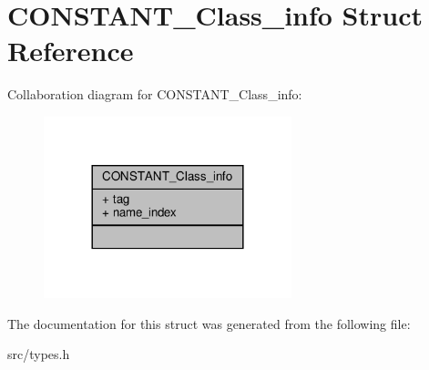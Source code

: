 \hypertarget{structCONSTANT__Class__info}{}\section{C\+O\+N\+S\+T\+A\+N\+T\+\_\+\+Class\+\_\+info Struct Reference}
\label{structCONSTANT__Class__info}


Collaboration diagram for C\+O\+N\+S\+T\+A\+N\+T\+\_\+\+Class\+\_\+info\+:
\nopagebreak
\begin{figure}[H]
\begin{center}
\leavevmode
\includegraphics[width=204pt]{structCONSTANT__Class__info__coll__graph}
\end{center}
\end{figure}


The documentation for this struct was generated from the following file\+:\begin{DoxyCompactItemize}
\item 
src/types.\+h\end{DoxyCompactItemize}

